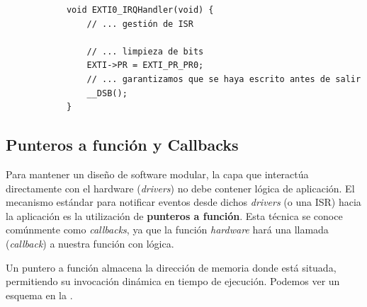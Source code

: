 \documentclass[../main.tex]{subfiles}
\begin{document}
        \begin{lstlisting}
            void EXTI0_IRQHandler(void) {
                // ... gestión de ISR

                // ... limpieza de bits
                EXTI->PR = EXTI_PR_PR0;
                // ... garantizamos que se haya escrito antes de salir
                __DSB();
            }
        \end{lstlisting}

    \subsection{Punteros a función y Callbacks}

        Para mantener un diseño de software modular, la capa que interactúa directamente con el hardware (\emph{drivers}) no debe contener lógica de aplicación. El mecanismo estándar para notificar eventos desde dichos \emph{drivers} (o una ISR) hacia la aplicación es la utilización de \textbf{punteros a función}. Esta técnica se conoce comúnmente como \emph{callbacks}, ya que la función \emph{hardware} hará una llamada (\emph{callback}) a nuestra función con lógica.

        Un puntero a función almacena la dirección de memoria donde está situada, permitiendo su invocación dinámica en tiempo de ejecución. Podemos ver un esquema en la .
\end{document}
